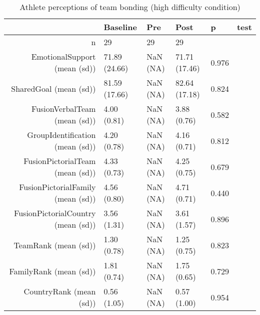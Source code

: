 \begin{table}[ht]
\centering
\begin{tabular}{rlllll}
  \hline
 & Baseline & Pre & Post & p & test \\ 
  \hline
n &    29 &  29 &    29 &  &  \\ 
  EmotionalSupport (mean (sd)) & 71.89 (24.66) & NaN (NA) & 71.71 (17.46) &  0.976 &  \\ 
  SharedGoal (mean (sd)) & 81.59 (17.66) & NaN (NA) & 82.64 (17.18) &  0.824 &  \\ 
  FusionVerbalTeam (mean (sd)) &  4.00 (0.81) & NaN (NA) &  3.88 (0.76) &  0.582 &  \\ 
  GroupIdentification (mean (sd)) &  4.20 (0.78) & NaN (NA) &  4.16 (0.71) &  0.812 &  \\ 
  FusionPictorialTeam (mean (sd)) &  4.33 (0.73) & NaN (NA) &  4.25 (0.75) &  0.679 &  \\ 
  FusionPictorialFamily (mean (sd)) &  4.56 (0.80) & NaN (NA) &  4.71 (0.71) &  0.440 &  \\ 
  FusionPictorialCountry (mean (sd)) &  3.56 (1.31) & NaN (NA) &  3.61 (1.57) &  0.896 &  \\ 
  TeamRank (mean (sd)) &  1.30 (0.78) & NaN (NA) &  1.25 (0.75) &  0.823 &  \\ 
  FamilyRank (mean (sd)) &  1.81 (0.74) & NaN (NA) &  1.75 (0.65) &  0.729 &  \\ 
  CountryRank (mean (sd)) &  0.56 (1.05) & NaN (NA) &  0.57 (1.00) &  0.954 &  \\ 
   \hline
\end{tabular}
\caption{Athlete perceptions of 
 team bonding (high difficulty condition)} 
\end{table}
